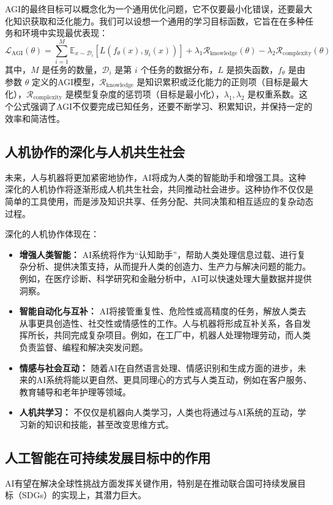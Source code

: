 AGI的最终目标可以概念化为一个通用优化问题，它不仅要最小化错误，还要最大化知识获取和泛化能力。我们可以设想一个通用的学习目标函数，它旨在在多种任务和环境中实现最优表现：
$$
\mathcal{L}_{\text{AGI}}(\theta) = \sum_{i=1}^{M} \mathbb{E}_{x \sim \mathcal{D}_i} \left[ L(f_\theta(x), y_i(x)) \right] + \lambda_1 \mathcal{R}_{\text{knowledge}}(\theta) - \lambda_2 \mathcal{R}_{\text{complexity}}(\theta)
$$
其中，$M$ 是任务的数量，$\mathcal{D}_i$ 是第 $i$ 个任务的数据分布，$L$ 是损失函数，$f_\theta$ 是由参数 $\theta$ 定义的AGI模型，$\mathcal{R}_{\text{knowledge}}$ 是知识累积或泛化能力的正则项（目标是最大化），$\mathcal{R}_{\text{complexity}}$ 是模型复杂度的惩罚项（目标是最小化），$\lambda_1, \lambda_2$ 是权重系数。这个公式\cite{ahmed2023deep}强调了AGI不仅要完成已知任务，还要不断学习、积累知识，并保持一定的效率和简洁性。

\subsection{人机协作的深化与人机共生社会}
未来，人与机器将更加紧密地协作，AI将成为人类的智能助手和增强工具。这种深化的人机协作将逐渐形成人机共生社会，共同推动社会进步。这种协作不仅仅是简单的工具使用，而是涉及知识共享、任务分配、共同决策和相互适应的复杂动态过程。

深化的人机协作体现在：
\begin{itemize}
    \item \textbf{增强人类智能：} AI系统将作为“认知助手”，帮助人类处理信息过载、进行复杂分析、提供决策支持，从而提升人类的创造力、生产力与解决问题的能力。例如，在医疗诊断、科学研究和金融分析中，AI可以快速处理大量数据并提供洞察。
    \item \textbf{智能自动化与互补：} AI将接管重复性、危险性或高精度的任务，解放人类去从事更具创造性、社交性或情感性的工作。人与机器将形成互补关系，各自发挥所长，共同完成复杂项目。例如，在工厂中，机器人处理物理劳动，而人类负责监督、编程和解决突发问题。
    \item \textbf{情感与社会互动：} 随着AI在自然语言处理、情感识别和生成方面的进步，未来的AI系统将能以更自然、更具同理心的方式与人类互动，例如在客户服务、教育辅导和老年护理等领域。
    \item \textbf{人机共学习：} 不仅仅是机器向人类学习，人类也将通过与AI系统的互动，学习新的知识和技能，甚至改变思维方式。
\end{itemize}

\subsection{人工智能在可持续发展目标中的作用}
AI有望在解决全球性挑战方面发挥关键作用，特别是在推动联合国可持续发展目标（SDGs）的实现上，其潜力巨大。

